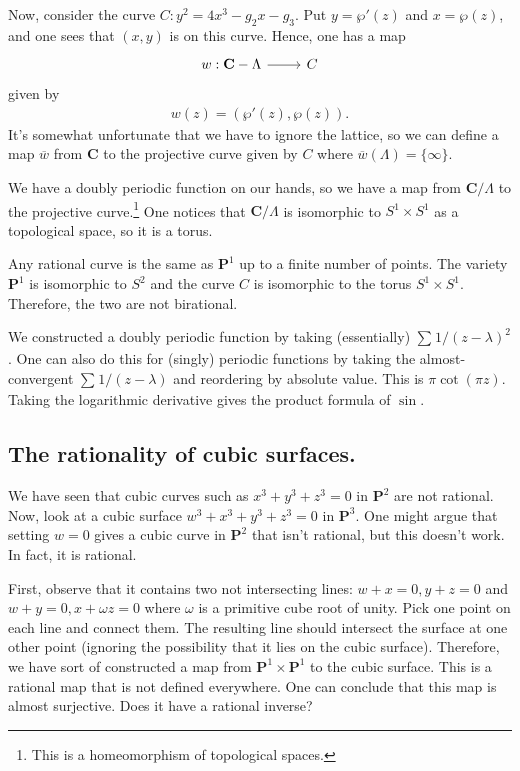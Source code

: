 \documentclass [11 pt, oneside] {article}
\begin{document}
Now, consider the curve $C:y^2 = 4x^3 - g_2x-g_3$. Put $y=\wp'(z)$ and $x=\wp(z)$, and one sees that $(x,y)$ is on this curve. Hence, one has a map 
\[
\begin{tikzcd}
w:\mathbf{C}-\Lambda \ar[r]& C
\end{tikzcd}
\] 
given by
\begin{align*}
	w(z)= (\wp'(z),\wp (z)).
\end{align*}
It's somewhat unfortunate that we have to ignore the lattice, so we can define a map $\overline{w}$ from $\mathbf{C}$ to the projective curve given by $C$ where $\overline{w}(\Lambda) = \{\infty\}$. 

We have a doubly periodic function on our hands, so we have a map from $\mathbf{C}/\Lambda$ to the projective curve.\footnote{This is a homeomorphism of topological spaces.} One notices that $\mathbf{C}/\Lambda$ is isomorphic to $S^1\times S^1$ as a topological space, so it is a torus.

Any rational curve is the same as $\mathbf{P}^1$ up to a finite number of points. The variety $\mathbf{P}^1$ is isomorphic to $S^2$ and the curve $C$ is isomorphic to the torus $S^1\times S^1$. Therefore, the two are not birational.

\begin{remark}
	We constructed a doubly periodic function by taking (essentially) $\sum_{}^{} 1/(z-\lambda)^2 $. One can also do this for (singly) periodic functions by taking the almost-convergent $\sum_{}^{} 1/(z-\lambda)$ and reordering by absolute value. This is $\pi\cot (\pi z)$. Taking the logarithmic derivative gives the product formula of $\sin$.
\end{remark}

\subsection{The rationality of cubic surfaces.}
We have seen that cubic curves such as $x^3+y^3+z^3=0$ in $\mathbf{P}^2$ are not rational. Now, look at a cubic surface $w^3+x^3+y^3+z^3= 0$ in $\mathbf{P}^3$. One might argue that setting $w=0$ gives a cubic curve in $\mathbf{P}^2$ that isn't rational, but this doesn't work. In fact, it is rational.

First, observe that it contains two not intersecting lines: $w+x=0, y+z=0$ and $w+y=0, x+\omega z=0$ where $\omega$ is a primitive cube root of unity. Pick one point on each line and connect them. The resulting line should intersect the surface at one other point (ignoring the possibility that it lies on the cubic surface). Therefore, we have sort of constructed a map from $\mathbf{P}^1\times \mathbf{P}^1$ to the cubic surface. This is a rational map that is not defined everywhere. One can conclude that this map is almost surjective. Does it have a rational inverse?
\end{document}
